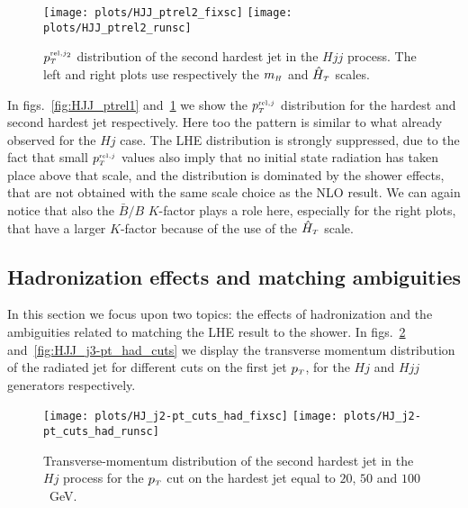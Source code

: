 \documentclass[paper]{JHEP3}
\newlength{\hfig}
\newlength{\hfigs}
\newcommand\mH{m_{\sss  H}}
\newcommand\HThat{\hat{H}_{\sss  T}}
\newcommand\ptreltwo{p_{\sss T}^{\sss {\rm rel},j_2}}
\newcommand\ptrel{p_{\sss T}^{\sss {\rm rel},j}}
\newcommand\sss{\mathchoice%
{\displaystyle}%
{\scriptstyle}%
{\scriptscriptstyle}%
{\scriptscriptstyle}%
}
\newcommand\pT{p_{\sss T}}
\begin{document}
\begin{figure}[htb]
\begin{center}
\texttt{[image: plots/HJJ\_ptrel2\_fixsc]}  \nolinebreak
\texttt{[image: plots/HJJ\_ptrel2\_runsc]} 
\caption{$\ptreltwo$ distribution of the second hardest jet in the $Hjj$
  process. The left and right plots use respectively the $\mH$ and $\HThat$
  scales.}
\label{fig:HJJ_ptrel2}
\end{center}
\end{figure}
In figs.~\ref{fig:HJJ_ptrel1} and~\ref{fig:HJJ_ptrel2} we show the $\ptrel$
distribution for the hardest and second hardest jet respectively. Here too
the pattern is similar to what already observed for the $Hj$ case. The LHE
distribution is strongly suppressed, due to the fact that small
$\ptrel$ values also imply that no initial state radiation has taken place
above that scale, and the distribution is dominated by the shower effects,
that are not obtained with the same scale choice as the NLO result. We can
again notice that also the $\bar{B}/B$ $K$-factor plays a role here,
especially for the right plots, that have a larger $K$-factor because of the
use of the $\HThat$ scale.



\clearpage
\subsection{Hadronization effects and matching ambiguities}
In this section we focus upon two topics: the effects of hadronization and
the ambiguities related to matching the LHE result to the shower.  In
figs.~\ref{fig:HJ_j2-pt_cuts_had} and~\ref{fig:HJJ_j3-pt_had_cuts} we display
the transverse momentum distribution of the radiated jet for different cuts
on the first jet $\pT$, for the $Hj$ and $Hjj$ generators respectively.
\begin{figure}[htb]
\begin{center}
\texttt{[image: plots/HJ\_j2-pt\_cuts\_had\_fixsc]} \nolinebreak
\texttt{[image: plots/HJ\_j2-pt\_cuts\_had\_runsc]}
\caption{Transverse-momentum distribution of the second hardest jet in the
  $Hj$ process for the $\pT$ cut on the hardest jet equal to
  $20$, $50$ and $100$~GeV.}
\label{fig:HJ_j2-pt_cuts_had}
\end{center}
\end{figure}
\end{document}

